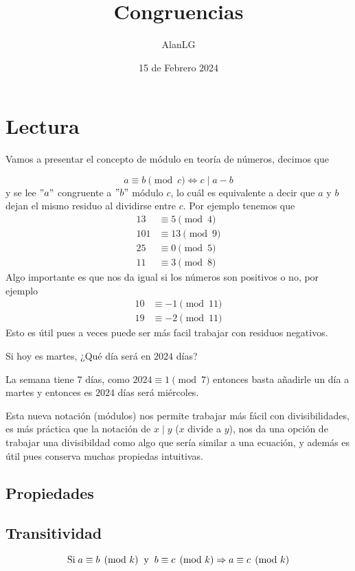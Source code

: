 \documentclass[11pt]{scrartcl}
\title{Congruencias}
\author{AlanLG}
\date{15 de Febrero 2024}
\begin{document}
\maketitle

\section{Lectura}
Vamos a presentar el concepto de módulo en teoría de números, decimos que 

\[a\equiv b\pmod c \iff c\mid a-b\]
y se lee $"a"$ congruente a $"b"$ módulo $c$, lo cuál es equivalente a decir que $a$ y $b$ dejan el mismo residuo al dividirse entre $c$. Por ejemplo tenemos que 
\begin{align*}
13 &\equiv 5\pmod 4\\
101 &\equiv 13\pmod 9\\
25 &\equiv 0\pmod 5\\
11 &\equiv 3\pmod 8 \end{align*}
Algo importante es que nos da igual si los números son positivos o no, por ejemplo 
\begin{align*}
10 &\equiv -1\pmod {11}\\
19 &\equiv -2\pmod {11} \end{align*}
Esto es útil pues a veces puede ser más facil trabajar con residuos negativos.
\vspace{0.2cm}

\begin{example}
    Si hoy es martes, ¿Qué día será en $2024$ días?
    \end{example}
\begin{flushleft}La semana tiene $7$ días, como $2024\equiv 1\pmod 7$ entonces basta añadirle un día a martes y entonces es $2024$ días será miércoles.
\end{flushleft}
  
\begin{flushleft}
Esta nueva notación (módulos) nos permite trabajar más fácil con divisibilidades, es más práctica que la notación de $x\mid y$ ($x$ divide a $y$), nos da una opción de trabajar una divisibildad como algo que sería similar a una ecuación, y además es útil pues conserva muchas propiedas intuitivas.\end{flushleft}
\subsection{Propiedades}
\subsection*{Transitividad}
\[\text{Si} \hspace{0.1cm} a\equiv b\pmod k \hspace{0.2cm} \text{y} \hspace{0.2cm} b\equiv c\pmod k \Rightarrow a\equiv c\pmod k\]
\end{document}
